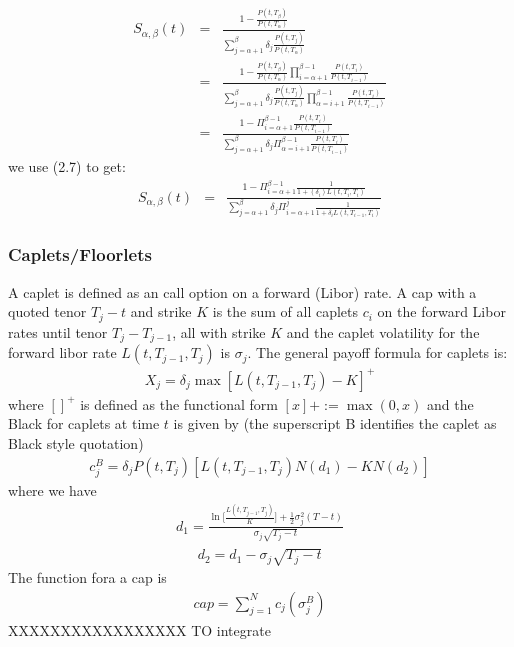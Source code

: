\documentclass[11pt]{article}
\numberwithin{equation}{subsection}
\begin{document}
\begin{eqnarray}
S_{\alpha, \beta}(t) &=& \frac{1- \frac{P(t, T_{\beta})}{P(t, T_{\alpha})}}{\sum_{j=\alpha+1}^{\beta} \delta_{j} \frac{P(t, T_j)}{P(t, T_{\alpha})}} \\
&=& \frac{1- \frac{P(t, T_{\beta})}{P(t, T_{\alpha})} \prod_{i=\alpha+1}^{\beta-1}{\frac{P(t, T_i)}{P(t, T_{i-1})}}}{\sum_{j=\alpha+1}^{\beta} \delta_{j} \frac{P(t, T_j)}{P(t, T_{\alpha})} \prod_{\alpha=i+1}^{\beta-1}{\frac{P(t, T_i)}{P(t, T_{i-1})}} }  \\
&=& \frac{1-\Pi_{i=\alpha+1}^{\beta-1}{\frac{P(t, T_i)}{P(t, T_{i-1})}}}{\sum_{j=\alpha + 1}^{\beta} \delta_j \Pi_{\alpha=i+1}^{\beta-1}{\frac{P(t, T_i)}{P(t, T_{i-1})}}}
\end{eqnarray}
we use (2.7) to get:
\begin{eqnarray}
S_{\alpha, \beta}(t) &=& \frac{1-\Pi_{i=\alpha+1}^{\beta-1}{\frac{1}{1+(\delta_i)L(t, T_{i}, T_i)}}}{\sum_{j=\alpha + 1}^{\beta} \delta_j \Pi_{i=\alpha+1}^{j}{\frac{1}{1 + \delta_{i} L(t, T_{i-1}, T_i)}}}
\end{eqnarray}
\subsubsection{Caplets/Floorlets}
A caplet is defined as an call option on a forward (Libor) rate. A cap with a quoted tenor \(T_{j}-t\) and strike \(K\) is the sum of all caplets \(c_i\) on the forward Libor rates until tenor \(T_{j}-T_{j-1}\), all with strike \(K\) and the caplet volatility for the forward libor rate \(L(t, T_{j-1}, T_{j})\) is \(\sigma_{j}\). The general payoff formula for caplets is:
\begin{eqnarray}
X_j = \delta_{j} \max[L(t, T_{j-1}, T_j)-K]^{+}
\end{eqnarray}
where \([]^+\) is defined as the functional form \([x]+ := \max(0, x)\) and the Black for caplets at time \(t\) is given by (the superscript B identifies the caplet as Black style quotation)
\begin{eqnarray}
c_j^{B} = \delta_{j} P(t, T_{j}) [L(t, T_{j-1}, T_j)N(d_1) -K N(d_2)]
\end{eqnarray}
where we have 
\begin{eqnarray}
	d_1 = \frac{\ln\bigg[\frac{L(t, T_{j-1}, T_j)}{K}\bigg]+\frac{1}{2}\sigma_j^2(T-t)}{\sigma_j\sqrt{T_j-t}}
\end{eqnarray}
\begin{eqnarray}
	d_2 = d_1 - \sigma_j \sqrt{T_j-t}
\end{eqnarray}
The function fora a cap is
\begin{eqnarray}
	cap = \sum_{j=1}^{N} c_{j}(\sigma_{j}^{B})
\end{eqnarray}
XXXXXXXXXXXXXXXXX
TO integrate 
\end{document}
